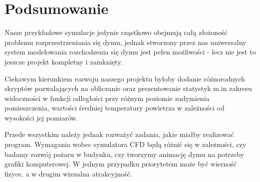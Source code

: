\documentclass{article}
\begin{document}
	\vspace{12mm}
	\section{Podsumowanie}
	Nasze przykładowe symulacje jedynie cząstkowo obejmują całą złożoność problemu rozprzestrzeniania się dymu, jednak stworzony przez nas uniwersalny system modelowania rozchodzenia się dymu jest pełen możliwości - lecz nie jest to jeszcze projekt kompletny i zamknięty. 
	
	\medskip
	\medskip
	\noindent Ciekawym kierunkiem rozwoju naszego projektu byłoby dodanie różnorodnych skryptów pozwalających na obliczanie oraz prezentowanie statystyk m.in zakresu widoczności w funkcji odległości przy różnym poziomie zadymienia pomieszczenia, wartości średniej temperatury powietrza w zależności od wysokości jej pomiarów. 
	
	\medskip
	\medskip
	\noindent Przede wszystkim należy jednak rozważyć zadania, jakie miałby realizować program. Wymagania wobec symulatora CFD będą różnić się w zależności, czy badamy rozwój pożaru w budynku, czy tworzymy animację dymu na potrzeby grafiki komputerowej. W jednym przypadku priorytetem może być wierność fizyce, a w drugim wizualna atrakcyjność.
	
	\newpage
	
\end{document}
